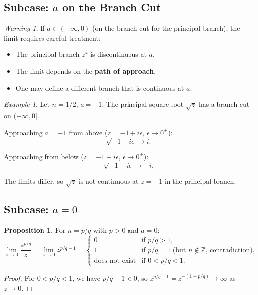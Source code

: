\documentclass{article}
\theoremstyle{definition}
\newtheorem{proposition}{Proposition}[section]
\theoremstyle{remark}
\newtheorem{example}{Example}[section]
\newtheorem{warning}{Warning}[section]
\newcommand{\Z}{\mathbb{Z}}
\begin{document}
\subsection{Subcase: $a$ on the Branch Cut}

\begin{warning}
If $a \in (-\infty, 0)$ (on the branch cut for the principal branch), the limit requires careful treatment:
\begin{itemize}
    \item The principal branch $z^n$ is discontinuous at $a$.
    \item The limit depends on the \textbf{path of approach}.
    \item One may define a different branch that is continuous at $a$.
\end{itemize}
\end{warning}

\begin{example}
Let $n = 1/2$, $a = -1$. The principal square root $\sqrt{z}$ has a branch cut on $(-\infty, 0]$.

Approaching $a = -1$ from above ($z = -1 + i\epsilon$, $\epsilon \to 0^+$):
\[
\sqrt{-1 + i\epsilon} \to i.
\]

Approaching from below ($z = -1 - i\epsilon$, $\epsilon \to 0^+$):
\[
\sqrt{-1 - i\epsilon} \to -i.
\]

The limits differ, so $\sqrt{z}$ is not continuous at $z = -1$ in the principal branch.
\end{example}

\subsection{Subcase: $a = 0$}

\begin{proposition}
For $n = p/q$ with $p > 0$ and $a = 0$:
\begin{equation}
\lim_{z \to 0} \frac{z^{p/q}}{z} = \lim_{z \to 0} z^{p/q - 1} = 
\begin{cases}
0 & \text{if } p/q > 1, \\
1 & \text{if } p/q = 1 \text{ (but } n \notin \Z\text{, contradiction)}, \\
\text{does not exist} & \text{if } 0 < p/q < 1.
\end{cases}
\end{equation}
\end{proposition}

\begin{proof}
For $0 < p/q < 1$, we have $p/q - 1 < 0$, so $z^{p/q - 1} = z^{-(1 - p/q)} \to \infty$ as $z \to 0$.
\end{proof}
\end{document}
